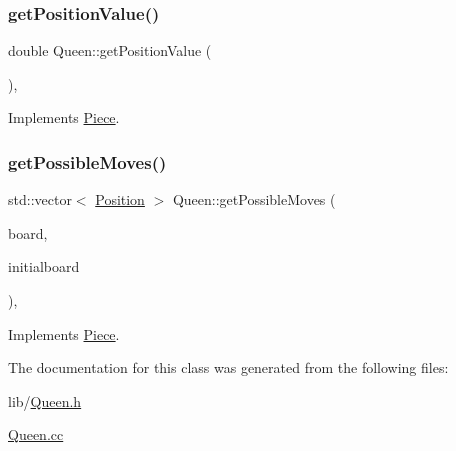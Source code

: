 \subsubsection{\texorpdfstring{get\+Position\+Value()}{getPositionValue()}}
{\footnotesize\ttfamily double Queen\+::get\+Position\+Value (\begin{DoxyParamCaption}{ }\end{DoxyParamCaption})\hspace{0.3cm}{\ttfamily [override]}, {\ttfamily [virtual]}}



Implements \hyperlink{class_piece_a4adfa58b4f0368c9a5859afcf294e0a4}{Piece}.

\mbox{\label{class_queen_a54461f7bace6797676679ad1da5901d3}} 
\subsubsection{\texorpdfstring{get\+Possible\+Moves()}{getPossibleMoves()}}
{\footnotesize\ttfamily std\+::vector$<$ \hyperlink{struct_position}{Position} $>$ Queen\+::get\+Possible\+Moves (\begin{DoxyParamCaption}\item[{std\+::shared\+\_\+ptr$<$ \hyperlink{class_base_board}{Base\+Board} $>$}]{board,  }\item[{bool}]{initialboard }\end{DoxyParamCaption})\hspace{0.3cm}{\ttfamily [override]}, {\ttfamily [virtual]}}



Implements \hyperlink{class_piece_a8891924c280568529878549f59541925}{Piece}.



The documentation for this class was generated from the following files\+:\begin{DoxyCompactItemize}
\item 
lib/\hyperlink{_queen_8h}{Queen.\+h}\item 
\hyperlink{_queen_8cc}{Queen.\+cc}\end{DoxyCompactItemize}
